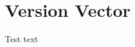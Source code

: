 \section{Version Vector}
Test text


\begin{equation}
 [ (pid, version), (pid, version), (pid, version) ]
\end{equation}
